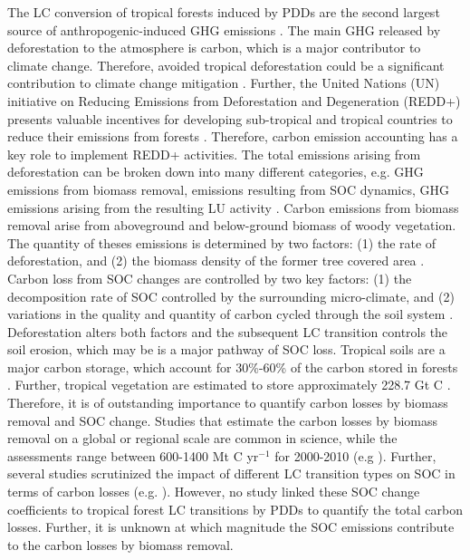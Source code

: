 	The \ac{LC} conversion of tropical forests induced by \acp{PDD} are the second largest source of anthropogenic-induced \ac{GHG} emissions \citep{Don2010}. The main \ac{GHG} released by deforestation to the atmosphere is carbon, which is a major contributor to climate change. Therefore, avoided tropical deforestation could be a significant contribution to climate change mitigation \citep{Don2010}. Further, the United Nations (UN) initiative on Reducing Emissions from Deforestation and Degeneration (REDD+) presents valuable incentives for developing sub-tropical and tropical countries to reduce their emissions from forests \citep{Avitabile2016}. Therefore, carbon emission accounting has a key role to implement REDD+ activities. The total emissions arising from deforestation can be broken down into many different categories, e.g. \ac{GHG} emissions from biomass removal, emissions resulting from \ac{SOC} dynamics, \ac{GHG} emissions arising from the resulting \ac{LU} activity \citep{Avitabile2016}. Carbon emissions from biomass removal arise from aboveground and below-ground biomass of woody vegetation. The quantity of theses emissions is determined by two factors: (1) the rate of deforestation, and (2) the biomass density of the former tree covered area \citep{Houghton2012a}. Carbon loss from \ac{SOC} changes are controlled by two key factors: (1) the decomposition rate of \ac{SOC} controlled by the surrounding micro-climate, and (2) variations in the quality and quantity of carbon cycled through the soil system \citep{Don2010}. Deforestation alters both factors and the subsequent \ac{LC} transition controls the soil erosion, which may be is a major pathway of \ac{SOC} loss. Tropical soils are a major carbon storage, which account for 30\%-60\% of the carbon stored in forests \citep{Don2010}. Further, tropical vegetation are estimated to store approximately 228.7 Gt C \citep{Baccini2012}. Therefore, it is of outstanding importance to quantify carbon losses by biomass removal and \ac{SOC} change. Studies that estimate the carbon losses by biomass removal on a global or regional scale are common in science, while the assessments range between 600-1400 Mt C yr$^{-1}$ for 2000-2010 (e.g \citet{Houghton2012,Achard2014,Sy2015,Baccini2012}). Further, several studies scrutinized the impact of different \ac{LC} transition types on \ac{SOC} in terms of carbon losses (e.g. \citet{Don2010,Rahman2018,Villarino2017}). However, no study linked these \ac{SOC} change coefficients to tropical forest \ac{LC} transitions by \acp{PDD} to quantify the total carbon losses. Further, it is unknown at which magnitude the \ac{SOC} emissions contribute to the carbon losses by biomass removal.

